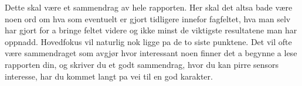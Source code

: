 Dette skal være et sammendrag av hele rapporten. Her skal det altsa bade være noen ord om hva som eventuelt er gjort tidligere innefor fagfeltet, hva man selv har gjort for a bringe feltet videre og ikke minst de viktigste resultatene man har oppnadd. Hovedfokus vil naturlig nok ligge pa de to siste punktene. Det vil ofte være sammendraget som avgjør hvor interessant noen finner det a begynne a lese rapporten din, og skriver du et godt sammendrag, hvor du kan pirre sensors interesse, har du kommet langt pa vei til en god karakter.